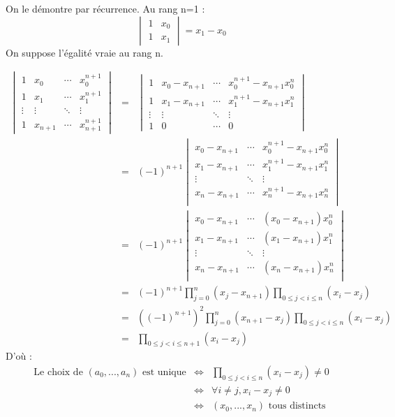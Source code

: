 \begin{dem}
On le démontre par récurrence. Au rang n=1 : \[\begin{vmatrix} 1 & x_0 \\ 1 & x_1 \end{vmatrix} = x_1 - x_0\]
On suppose l'égalité vraie au rang n.

\begin{eqnarray*}
\begin{vmatrix}
1 & x_0 & \cdots & x_0^{n+1} \\
1 & x_1 & \cdots & x_1^{n+1} \\
\vdots & \vdots & \ddots & \vdots \\
1 & x_{n+1} & \cdots & x_{n+1}^{n+1} 
\end{vmatrix}
&=& 
\begin{vmatrix}
1 & x_0-x_{n+1} & \cdots & x_0^{n+1}-x_{n+1}x_0^n \\
1 & x_1-x_{n+1} & \cdots & x_1^{n+1}-x_{n+1}x_1^n \\
\vdots & \vdots & \ddots & \vdots \\
1 & 0 & \cdots & 0 
\end{vmatrix} \\
&=&(-1)^{n+1} \begin{vmatrix}
x_0-x_{n+1} & \cdots & x_0^{n+1}-x_{n+1}x_0^n \\
x_1-x_{n+1} & \cdots & x_1^{n+1}-x_{n+1}x_1^n \\
\vdots      & \ddots &         \vdots         \\
x_n-x_{n+1} & \cdots & x_n^{n+1}-x_{n+1}x_n^n \\
\end{vmatrix} \\
&=&(-1)^{n+1} \begin{vmatrix}
x_0-x_{n+1} & \cdots & (x_0-x_{n+1})x_0^n \\
x_1-x_{n+1} & \cdots & (x_1-x_{n+1})x_1^n \\
\vdots      & \ddots &         \vdots         \\
x_n-x_{n+1} & \cdots & (x_n-x_{n+1})x_n^n \\
\end{vmatrix}  \\ 
&=& (-1)^{n+1} \prod_{j=0}^n (x_j - x_{n+1})  \prod_{0\leq j<i \leq n} (x_i - x_j) \\
&=& ((-1)^{n+1})^2 \prod_{j=0}^n (x_{n+1} - x_j)  \prod_{0\leq j<i \leq n} (x_i - x_j) \\
&=& \prod_{0\leq j<i \leq n+1} (x_i - x_j)
\end{eqnarray*}
D'où :
\begin{eqnarray*}
\text{Le choix de } (a_0,...,a_n) \text{ est unique} &\Leftrightarrow&  \prod_{0\leq j<i \leq n} (x_i - x_j) \neq 0\\
&\Leftrightarrow& \forall i\neq j, x_i - x_j \neq 0 \\
&\Leftrightarrow& (x_0,...,x_n) \text{ tous distincts}
\end{eqnarray*}
\end{dem}

